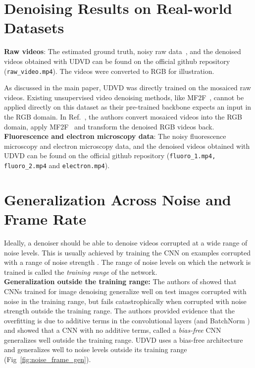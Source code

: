 \documentclass[final]{cvpr}
\begin{document}
\section{Denoising Results on Real-world Datasets}
\label{sec:denoise_micro}


\noindent \textbf{Raw videos}: The estimated ground truth, noisy raw data~\cite{rawvideo}, and the denoised videos obtained with UDVD can be found on the official github repository (\texttt{raw\_video.mp4}). The videos were converted to RGB for illustration. 

As discussed in the main paper, UDVD was directly trained on the mosaiced raw videos. Existing unsupervised video denoising methods, like MF2F~\cite{mf2f}, cannot be applied directly on this dataset as their pre-trained backbone expects an input in the RGB domain. In Ref.~\cite{mf2f}, the authors convert mosaiced videos into the RGB domain, apply MF2F~\cite{mf2f} and transform the denoised RGB videos back. \\

\noindent \textbf{Fluorescence and electron microscopy data}:
The noisy fluorescence microscopy and electron microscopy data, and the denoised videos obtained with UDVD can be found on the official github repository (\texttt{fluoro\_1.mp4, fluoro\_2.mp4} and \texttt{electron.mp4}).



\section{Generalization Across Noise and Frame Rate}
\label{sec:generalisation}

Ideally, a denoiser should be able to denoise videos corrupted at a wide range of noise levels. This is usually achieved by training the CNN on examples corrupted with a range of noise strength \cite{dncnn, fastdvdnet, dvdnet}. The range of noise levels on which the network is trained is called the \emph{training range} of the network.  \\

\noindent \textbf{Generalization outside the training range:} The authors of \cite{biasfree} showed that CNNs trained for image denoising generalize well on test images corrupted with noise in the training range, but fails catastrophically when corrupted with noise strength outside the training range. The authors provided evidence that the overfitting is due to additive terms in the convolutional layers (and BatchNorm \cite{batchnorm} ) and showed that a CNN with no additive terms, called a \emph{bias-free} CNN generalizes well outside the training range. UDVD uses a bias-free architecture and generalizes well to noise levels outside its training range (Fig~\ref{fig:noise_frame_gen}). \\
\end{document}
